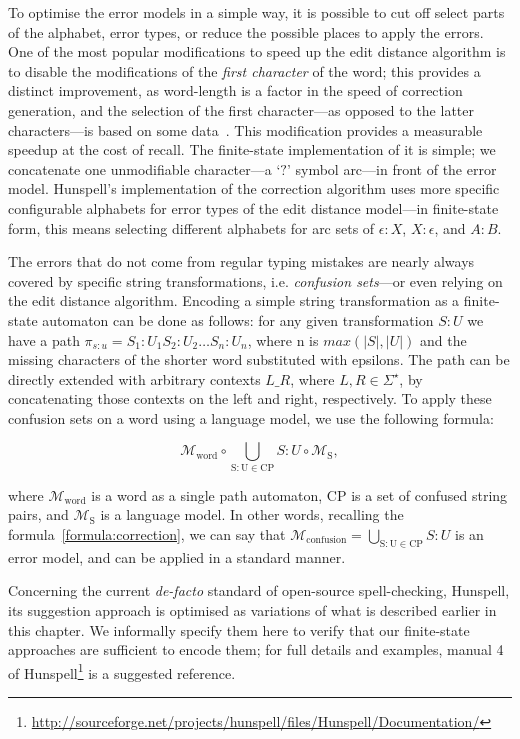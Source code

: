 \documentclass[a4paper,12pt]{article}
\begin{document}
To optimise the error models in a simple way, it is possible to cut off select parts
of the alphabet, error types, or reduce the possible places to apply the
errors. One of the most popular modifications to speed up the edit distance
algorithm is to disable the modifications of the \emph{first character} of the
word; this provides a distinct improvement, as word-length is a factor in the
speed of correction generation, and the selection of the first character---as
opposed to the latter characters---is based on some
data~\cite[]{bhagat2007spelling}. This modification provides a
measurable speedup at the cost of recall. The finite-state implementation of it
is simple; we concatenate one unmodifiable character---a `$?$' symbol arc---in
front of the error model. Hunspell's implementation of the correction
algorithm uses more specific configurable alphabets for error types of the edit
distance model---in finite-state form, this means selecting different alphabets
for arc sets of $\epsilon:X$, $X:\epsilon$, and $A:B$.

The errors that do not come from regular typing mistakes are nearly always
covered by specific string transformations, i.e. \emph{confusion sets}---or
even relying on the edit distance algorithm. Encoding a simple string
transformation as a finite-state automaton can be done as follows: for any
given transformation $S:U$ we have a path $\pi_{s:u} = S_1:U_1 S_2:U_2 \ldots
S_n:U_n$, where n is $max(|S|, |U|)$ and the missing characters of the shorter
word substituted with epsilons. The path can be directly extended with
arbitrary contexts $L \_ R$, where $L, R \in \Sigma^{\star}$, by concatenating
those contexts on the left and right, respectively. To apply these confusion sets
on a word using a language model, we use the following formula:

\begin{equation}
\mathcal{M}_{\mathrm{word}} \circ \bigcup_{\mathrm{S:U} \in \mathrm{CP}} S:U \circ \mathcal{M}_{\mathrm{S}},
\end{equation}

where $\mathcal{M}_{\mathrm{word}}$ is a word as a single path automaton,
$\mathrm{CP}$ is a set of confused string pairs, and
$\mathcal{M}_{\mathrm{S}}$ is a language model. In other words, recalling the
formula~\ref{formula:correction}, we can say that
$\mathcal{M}_{\mathrm{confusion}} = \bigcup_{\mathrm{S:U} \in \mathrm{CP}} S:U$
is an error model, and can be applied in a standard manner.

Concerning the current \emph{de-facto} standard of open-source spell-checking,
Hunspell, its suggestion approach is optimised as variations of what is
described earlier in this chapter. We informally specify them here to
verify that our finite-state approaches are sufficient to encode
them; for full details and examples, manual 4 of
Hunspell\footnote{\url{http://sourceforge.net/projects/hunspell/files/Hunspell/Documentation/}} is a suggested reference.
\end{document}
